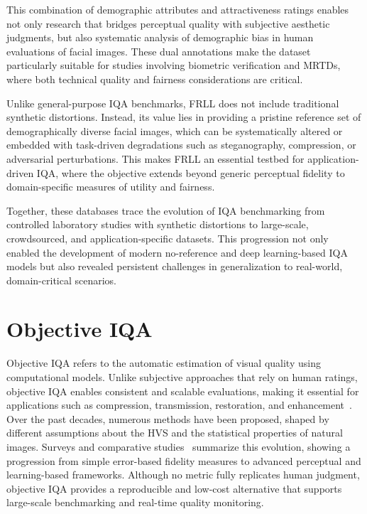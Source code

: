 This combination of demographic attributes and attractiveness ratings enables not only research that bridges perceptual quality with subjective aesthetic judgments, but also systematic analysis of demographic bias in human evaluations of facial images. These dual annotations make the dataset particularly suitable for studies involving biometric verification and \acs{MRTDs}, where both technical quality and fairness considerations are critical.

Unlike general-purpose IQA benchmarks, \acs{FRLL} does not include traditional synthetic distortions. Instead, its value lies in providing a pristine reference set of demographically diverse facial images, which can be systematically altered or embedded with task-driven degradations such as steganography, compression, or adversarial perturbations. This makes \acs{FRLL} an essential testbed for application-driven IQA, where the objective extends beyond generic perceptual fidelity to domain-specific measures of utility and fairness.

Together, these databases trace the evolution of \acs{IQA} benchmarking from controlled laboratory studies with synthetic distortions to large-scale, crowdsourced, and application-specific datasets. This progression not only enabled the development of modern no-reference and deep learning-based \acs{IQA} models but also revealed persistent challenges in generalization to real-world, domain-critical scenarios.

\section{Objective \acs{IQA}}\label{sec:objective_iqa}

Objective \acs{IQA} refers to the automatic estimation of visual quality using computational models. Unlike subjective approaches that rely on human ratings, objective \acs{IQA} enables consistent and scalable evaluations, making it essential for applications such as compression, transmission, restoration, and enhancement~\cite{gonzalez2009digital, moorthy2011blind, lin2020surpassing}. Over the past decades, numerous methods have been proposed, shaped by different assumptions about the \acf{HVS} and the statistical properties of natural images. Surveys and comparative studies~\cite{shahrukh2019survey, wang2004image, liu2012fusion, ding2020dists} summarize this evolution, showing a progression from simple error-based fidelity measures to advanced perceptual and learning-based frameworks. Although no metric fully replicates human judgment, objective \acs{IQA} provides a reproducible and low-cost alternative that supports large-scale benchmarking and real-time quality monitoring.

